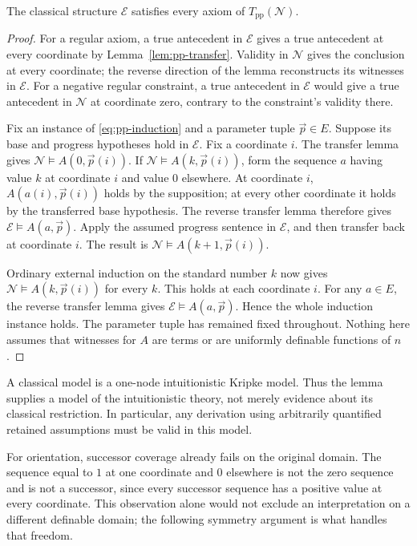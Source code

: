 \begin{lemma}
\label{lem:pp-model}
The classical structure $\mathcal E$ satisfies every axiom of
$T_{\mathrm{pp}}(\mathcal N)$.
\end{lemma}
\begin{proof}
For a regular axiom, a true antecedent in $\mathcal E$ gives a true
antecedent at every coordinate by Lemma~\ref{lem:pp-transfer}.  Validity
in $\mathcal N$ gives the conclusion at every coordinate; the reverse
direction of the lemma reconstructs its witnesses in $\mathcal E$.
For a negative regular constraint, a true antecedent in $\mathcal E$
would give a true antecedent in $\mathcal N$ at coordinate zero,
contrary to the constraint's validity there.

Fix an instance of \eqref{eq:pp-induction} and a parameter tuple
$\vec p\in E$.  Suppose its base and progress hypotheses hold in
$\mathcal E$.  Fix a coordinate $i$.  The transfer lemma gives
$\mathcal N\models A(0,\vec p(i))$.  If
$\mathcal N\models A(k,\vec p(i))$, form the sequence $a$
having value $k$ at coordinate $i$ and value $0$ elsewhere.  At
coordinate $i$, $A(a(i),\vec p(i))$ holds by the supposition;
at every other coordinate it holds by the transferred base hypothesis.
The reverse transfer lemma therefore gives
$\mathcal E\models A(a,\vec p)$.  Apply the assumed progress
sentence in $\mathcal E$, and then transfer back at coordinate $i$.
The result is
$\mathcal N\models A(k+1,\vec p(i))$.

Ordinary external induction on the standard number $k$ now gives
$\mathcal N\models A(k,\vec p(i))$ for every $k$.  This holds
at each coordinate $i$.  For any $a\in E$, the reverse transfer
lemma gives $\mathcal E\models A(a,\vec p)$.  Hence the whole
induction instance holds.  The parameter tuple has remained fixed
throughout.  Nothing here assumes that witnesses for $A$ are terms or
are uniformly definable functions of $n$.
\end{proof}

A classical model is a one-node intuitionistic Kripke model.  Thus the
lemma supplies a model of the intuitionistic theory, not merely evidence
about its classical restriction.  In particular, any derivation using
arbitrarily quantified retained assumptions must be valid in this model.

For orientation, successor coverage already fails on the original
domain.  The sequence equal to $1$ at one coordinate and $0$ elsewhere
is not the zero sequence and is not a successor, since every successor
sequence has a positive value at every coordinate.  This observation
alone would not exclude an interpretation on a different definable
domain; the following symmetry argument is what handles that freedom.


